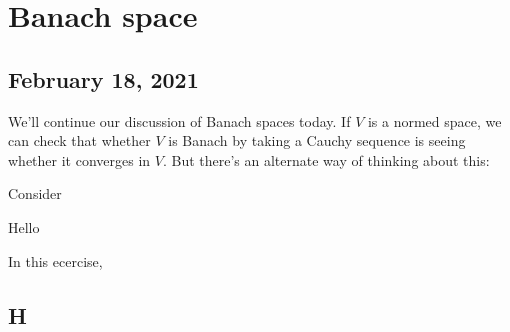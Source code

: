 \chapter{Banach space}
\section{February 18, 2021}

We'll continue our discussion of Banach spaces today. If $V$ is a normed space, we can check that whether $V$ is Banach by taking a Cauchy sequence is seeing whether it converges in $V$. But there's an alternate way of thinking about this:

\begin{theorem}
Consider 
\end{theorem}

\begin{lemma}
Hello
\end{lemma}

\begin{exercise}
In this ecercise, 
\end{exercise}


\section{H}
\begin{theorem}

\end{theorem}